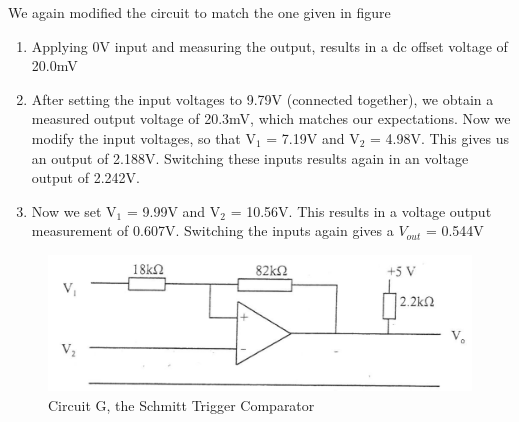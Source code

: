 
We again modified the circuit to match the one given in figure 
\begin{enumerate}
	\item Applying 0V input and measuring the output, results in a dc offset voltage of 20.0mV
	\item After setting the input voltages to 9.79V (connected together), we obtain a measured output voltage of 20.3mV, which matches our expectations. 
		Now we modify the input voltages, so that V$_1$ = 7.19V and V$_2$ = 4.98V. This gives us an output of 2.188V. 
		Switching these inputs results again in an voltage output of 2.242V. 
	\item Now we set V$_1$ = 9.99V and V$_2$ = 10.56V. This results in a voltage output measurement of 0.607V. Switching the inputs again gives a $V_{out}$ = 0.544V
\end{enumerate}




\begin{figure}[H] %
\begin{center}
\includegraphics[width=1\linewidth]{LabTwo/g}
\end{center}
\caption{Circuit G, the Schmitt Trigger Comparator}
\label{fig:2_voltage}
\end{figure}


